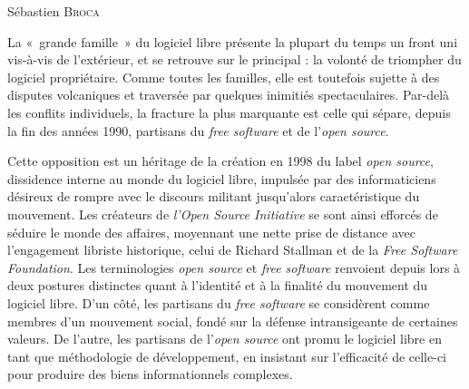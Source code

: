 \documentclass{FramateX}
\begin{document}
\begin{refsection}

\begin{flushright}
Sébastien \textsc{Broca}
\end{flushright}
\vspace{10 mm}


La «~grande famille~» du logiciel libre présente la plupart du temps un
front uni vis-à-vis de l'extérieur, et se retrouve sur
le principal : la volonté de triompher du logiciel propriétaire. Comme
toutes les familles, elle est toutefois sujette à des disputes
volcaniques et traversée par quelques inimitiés spectaculaires.
Par-delà les conflits individuels, la fracture la plus marquante est
celle qui sépare, depuis la fin des années 1990, partisans du
\textit{free software} et de l'\textit{open source}.

Cette opposition est un héritage de la création en 1998 du label
\textit{open source}, dissidence interne au monde du logiciel libre,
impulsée par des informaticiens désireux de rompre avec le discours
militant jusqu'alors caractéristique du mouvement. Les
créateurs de \textit{l'Open Source Initiative} se sont
ainsi efforcés de séduire le monde des affaires, moyennant une nette
prise de distance avec l'engagement libriste
historique, celui de Richard Stallman et de la \textit{Free Software
Foundation}. Les terminologies \textit{open source} et \textit{free
software} renvoient depuis lors à deux postures distinctes quant à
l'identité et à la finalité du mouvement du logiciel
libre. D'un côté, les partisans du \textit{free
software} se considèrent comme membres d'un mouvement
social, fondé sur la défense intransigeante de certaines valeurs. De
l'autre, les partisans de
l'\textit{open source} ont promu le logiciel libre en
tant que méthodologie de développement, en insistant sur
l'efficacité de celle-ci pour produire des biens
informationnels complexes. 


\end{refsection}
\end{document}
